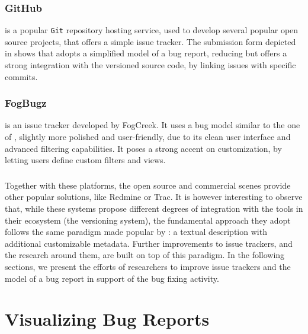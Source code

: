 \subsubsection{GitHub}
\gth{} is a popular \texttt{Git} repository hosting service, used to develop several popular open source projects, that offers a simple issue tracker.
The submission form depicted in  shows that \gth adopts a simplified model of a bug report, reducing
but offers a strong integration with the versioned source code, by linking issues with specific commits.

\subsubsection{FogBugz}
\fbz{} is an issue tracker developed by FogCreek. It uses a bug model similar to the one of \bzilla, slightly more polished and user-friendly, due to its clean user interface and advanced filtering capabilities. It poses a strong accent on customization, by letting users define custom filters and views.

\subsubsection{} %
Together with these platforms, the open source and commercial scenes provide other popular solutions, like Redmine or Trac.
It is however interesting to observe that, while these systems propose different degrees of integration with the tools in their ecosystem (\eg the versioning system), the fundamental approach they adopt follows the same paradigm made popular by \bzilla: a textual description with additional customizable metadata.
Further improvements to issue trackers, and the research around them, are built on top of this paradigm.
In the following sections, we present the efforts of researchers to improve issue trackers and the model of a bug report in support of the bug fixing activity.



\section{Visualizing Bug Reports}\label{sec:related-visualize} %


